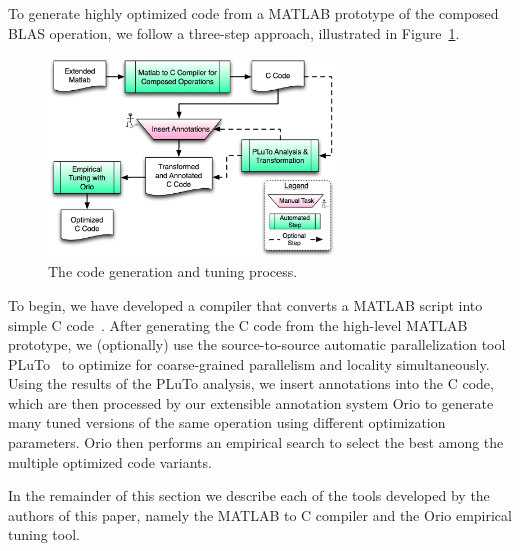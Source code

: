 \documentclass[runningheads]{llncs}
\begin{document}
To generate highly optimized code from a MATLAB prototype of the composed
BLAS operation, we follow a three-step approach, illustrated in
Figure~\ref{fig:process}.  
%
\begin{figure}
\vspace{-.2in}
\centering
\includegraphics[width=3in]{figures/process.png}
\caption{The code generation and tuning process.}
\label{fig:process}
\vspace{-.2in}
\end{figure}
%
To begin, we have developed a compiler that
converts a MATLAB script into simple C code~\cite{Siek}.  After generating
the C code from the high-level MATLAB prototype, we (optionally) use 
the source-to-source automatic parallelization tool PLuTo~\cite{Pluto} %
to optimize for coarse-grained parallelism and locality simultaneously. Using
the results of the PLuTo analysis, we insert annotations into the C code,
which are then processed by our extensible annotation system Orio to generate
many tuned versions of the same operation using different optimization
parameters. Orio then performs an empirical search to select the best among
the multiple optimized code variants.


In the remainder of this section we describe each of the tools developed by the authors of this paper, namely the MATLAB to C compiler and the Orio empirical tuning tool.

\end{document}
